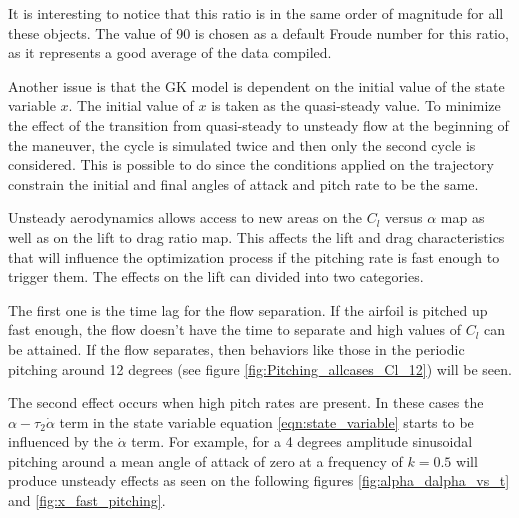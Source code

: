 \par It is interesting to notice that this ratio is in the same order of magnitude for all these objects.
The value of 90 is chosen as a default Froude number for this ratio, as it represents a good average of the data compiled.

\par Another issue is that the GK model is dependent on the initial value of the state variable $x$.
The initial value of $x$ is taken as the quasi-steady value.
To minimize the effect of the transition from quasi-steady to unsteady flow at the beginning of the maneuver, the cycle is simulated twice and then only the second cycle is considered.
This is possible to do since the conditions applied on the trajectory constrain the initial and final angles of attack and pitch rate to be the same.

 \label{sub:unsteady_effects}
Unsteady aerodynamics allows access to new areas on the $C_l$ versus $\alpha$ map as well as on the lift to drag ratio map.
This affects the lift and drag characteristics that will influence the optimization process if the pitching rate is fast enough to trigger them.
The effects on the lift can divided into two categories.

\par The first one is the time lag for the flow separation. 
If the airfoil is pitched up fast enough, the flow doesn't have the time to separate and high values of $C_l$ can be attained.
If the flow separates, then behaviors like those in the periodic pitching around 12 degrees (see figure \ref{fig:Pitching_allcases_Cl_12}) will be seen.

\par The second effect occurs when high pitch rates are present.
In these cases the $\alpha - \tau_2 \dot{\alpha}$ term in the state variable equation \ref{eqn:state_variable} starts to be influenced by the $\dot{\alpha}$ term. 
For example, for a 4 degrees amplitude sinusoidal pitching around a mean angle of attack of zero at a frequency of $k=0.5$ will produce unsteady effects as seen on the following figures \ref{fig:alpha_dalpha_vs_t} and \ref{fig:x_fast_pitching}.

